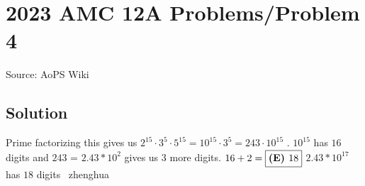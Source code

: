 \documentclass[12pt]{article}
\begin{document}
\section*{{2023 AMC 12A Problems/Problem 4}}
Source: AoPS Wiki

\subsection*{Solution}
Prime factorizing this gives us $2^{15}\cdot3^{5}\cdot5^{15}=10^{15}\cdot3^5=243\cdot10^{15}$ . $10^{15}$ has $16$ digits and $243$ = $2.43*10^{2}$ gives us $3$ more digits. $16+2=\text{\boxed{\textbf{(E) }18}}$ $2.43*10^{17}$ has $18$ digits ~zhenghua
\end{document}
